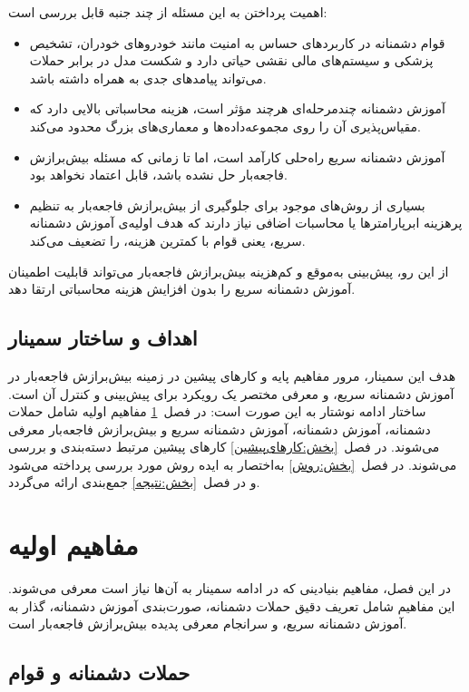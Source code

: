 \documentclass[11pt]{article}
\begin{document}
اهمیت پرداختن به این مسئله از چند جنبه قابل بررسی است:

\begin{itemize}
\item قوام دشمنانه در کاربردهای حساس به امنیت مانند خودروهای خودران، تشخیص پزشکی و سیستم‌های مالی نقشی حیاتی دارد و شکست مدل در برابر حملات می‌تواند پیامدهای جدی به همراه داشته باشد.
\item آموزش دشمنانه‌ چندمرحله‌ای هرچند مؤثر است، هزینه‌ محاسباتی بالایی دارد که مقیاس‌پذیری آن را روی مجموعه‌داده‌ها و معماری‌های بزرگ محدود می‌کند.
\item آموزش دشمنانه سریع راه‌حلی کارآمد است، اما تا زمانی که مسئله‌ بیش‌برازش فاجعه‌بار حل نشده باشد، قابل اعتماد نخواهد بود.
\item بسیاری از روش‌های موجود برای جلوگیری از بیش‌برازش فاجعه‌بار به تنظیم پرهزینه‌ ابرپارامترها یا محاسبات اضافی نیاز دارند که هدف اولیه‌ی آموزش دشمنانه سریع، یعنی قوام با کمترین هزینه، را تضعیف می‌کند.
\end{itemize}

از این رو، پیش‌بینی به‌موقع و کم‌هزینه‌ بیش‌برازش فاجعه‌بار می‌تواند
قابلیت اطمینان آموزش دشمنانه سریع را بدون افزایش هزینه‌ محاسباتی ارتقا دهد.

\subsection{اهداف و ساختار سمینار}\label{بخش:اهداف}

هدف این سمینار، مرور مفاهیم پایه و کارهای پیشین در زمینه‌ بیش‌برازش فاجعه‌بار در آموزش دشمنانه سریع،
و معرفی مختصر یک رویکرد برای پیش‌بینی و کنترل آن است.
ساختار ادامه‌ نوشتار به این صورت است:
در فصل~\ref{بخش:مفاهیم} مفاهیم اولیه شامل حملات دشمنانه، آموزش دشمنانه، آموزش دشمنانه سریع و بیش‌برازش فاجعه‌بار معرفی می‌شوند.
در فصل~\ref{بخش:کارهای‌پیشین} کارهای پیشین مرتبط دسته‌بندی و بررسی می‌شوند.
در فصل~\ref{بخش:روش} به‌اختصار به ایده‌ روش مورد بررسی پرداخته می‌شود
و در فصل~\ref{بخش:نتیجه} جمع‌بندی ارائه می‌گردد.


\section{مفاهیم اولیه}\label{بخش:مفاهیم}

در این فصل، مفاهیم بنیادینی که در ادامه‌ سمینار به آن‌ها نیاز است معرفی می‌شوند.
این مفاهیم شامل تعریف دقیق حملات دشمنانه، صورت‌بندی آموزش دشمنانه،
گذار به آموزش دشمنانه سریع، و سرانجام معرفی پدیده‌ بیش‌برازش فاجعه‌بار است.

\subsection{حملات دشمنانه و قوام}
\end{document}
